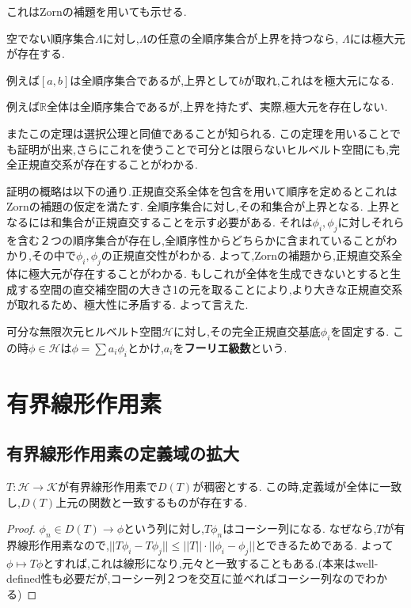\documentclass[uplatex]{jsbook}
\begin{document}
これはZornの補題を用いても示せる.

\begin{thm}[Zornの補題]
空でない順序集合$\Lambda$に対し,$\Lambda$の任意の全順序集合が上界を持つなら,
$\Lambda$には極大元が存在する.
\end{thm}

\begin{epl}
 例えば$[a,b]$は全順序集合であるが,上界として$b$が取れ,これはを極大元になる.
\end{epl}

\begin{epl}
 例えば$\mathbb{R}$全体は全順序集合であるが,上界を持たず、実際,極大元を存在しない.
\end{epl}

またこの定理は選択公理と同値であることが知られる.
この定理を用いることでも証明が出来,さらにこれを使うことで可分とは限らないヒルベルト空間にも,完全正規直交系が存在することがわかる.

証明の概略は以下の通り.正規直交系全体を包含を用いて順序を定めるとこれはZornの補題の仮定を満たす.
全順序集合に対し,その和集合が上界となる.
上界となるには和集合が正規直交することを示す必要がある.
それは$\phi_i, \phi_j$に対しそれらを含む２つの順序集合が存在し,全順序性からどちらかに含まれていることがわかり,その中で$\phi_i, \phi_j$の正規直交性がわかる.
よって,Zornの補題から,正規直交系全体に極大元が存在することがわかる.
もしこれが全体を生成できないとすると生成する空間の直交補空間の大きさ1の元を取ることにより,より大きな正規直交系が取れるため、極大性に矛盾する.
よって言えた.

\begin{screen}
\begin{dfn}
可分な無限次元ヒルベルト空間$\mathcal{H}$に対し,その完全正規直交基底$\phi_i$を固定する.
この時$\phi \in \mathcal{H}$は$\phi = \sum a_i \phi_i$とかけ,$a_i$を\textbf{フーリエ級数}という.
\end{dfn}
\end{screen}

\section{有界線形作用素}
\subsection{有界線形作用素の定義域の拡大}

\begin{thm}
$T:\mathcal{H} \to \mathcal{K}$が有界線形作用素で$D(T)$が稠密とする.
この時,定義域が全体に一致し,$D(T)$上元の関数と一致するものが存在する.
\end{thm}
\begin{proof}
$\phi_n \in D(T) \to \phi$という列に対し,$T\phi_n$はコーシー列になる.
なぜなら,$T$が有界線形作用素なので,$||T\phi_i - T \phi_j|| \le ||T|| \cdot || \phi_i - \phi_j||$とできるためである.
よって$\phi \mapsto T\phi$とすれば,これは線形になり,元々と一致することもある.(本来はwell-defined性も必要だが,コーシー列２つを交互に並べればコーシー列なのでわかる)
\end{proof}
\end{document}
